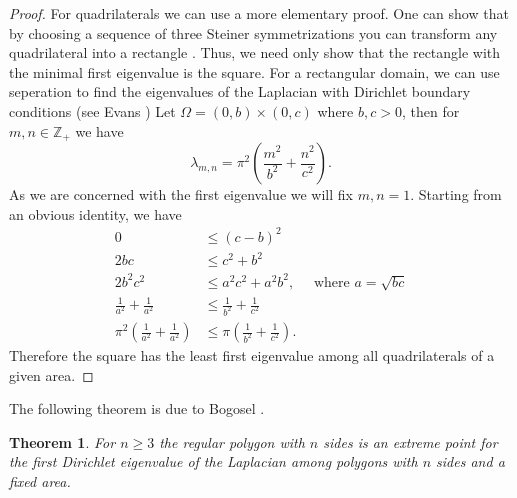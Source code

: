 \documentclass[12pt]{report}
\newtheorem{theorem}{Theorem}[section]
\numberwithin{definition}{section}
\begin{document}
\begin{proof}
  For quadrilaterals we can use a more elementary proof.
  One can show that by choosing a sequence of three Steiner symmetrizations you can transform any quadrilateral into a rectangle \cite{henrot}.
  Thus, we need only show that the rectangle with the minimal first eigenvalue is the square.
  For a rectangular domain, we can use seperation to find the eigenvalues of the Laplacian with Dirichlet boundary conditions (see Evans \cite{evans})
  Let $\Omega = \left( 0, b \right) \times \left( 0,c \right)$ where $b,c > 0$, then for $m,n\in \mathbb{Z}_{+}$ we have
  \[
  \lambda_{m,n} = \pi^{2}\left( \frac{m^{2}}{b^{2}} + \frac{n^{2}}{c^{2}} \right)
  .\] 
  As we are concerned with the first eigenvalue we will fix $m,n = 1$.
  Starting from an obvious identity, we have
  \begin{align*}
    0 &\leq \left( c - b \right)^{2} \\
    2bc &\leq c^{2} + b^{2} \\
    2b^{2}c^{2} &\leq a^{2}c^{2} + a^{2}b^{2}, \quad \text{ where } a = \sqrt{bc} \\
    \frac{1}{a^{2}} + \frac{1}{a^{2}} &\leq \frac{1}{b^{2} } + \frac{1}{c^{2}} \\
    \pi^{2}\left( \frac{1}{a^{2}} + \frac{1}{a^{2}} \right) &\leq \pi \left( \frac{1}{b^{2} } + \frac{1}{c^{2}} \right)
  .\end{align*}
  Therefore the square has the least first eigenvalue among all quadrilaterals of a given area.
\end{proof}

The following theorem is due to Bogosel \cite{bogosel}.

\begin{theorem}
  For $n \geq 3$ the regular polygon with $n$ sides is an extreme point for the first Dirichlet eigenvalue of the Laplacian among polygons with $n$ sides and a fixed area.
\end{theorem}
\end{document}
